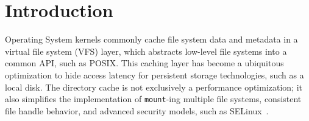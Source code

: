 \section{Introduction}
\label{sec:dcache:intro}

Operating System kernels commonly cache file system data and metadata in 
a virtual file system (VFS) layer, which abstracts low-level file systems into a common API, 
such as POSIX.  
This caching layer has become a ubiquitous optimization
to hide access latency for 
persistent storage technologies, such as a local disk.
The directory cache is not exclusively a performance optimization; it also simplifies 
the implementation of {\tt mount}-ing multiple file systems, 
consistent file handle behavior,
and advanced security 
models, such as SELinux~\citep{selinux}.







